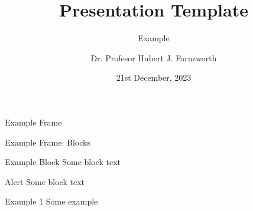 \documentclass[aspectratio=43]{beamer}
\title{Presentation Template}
\subtitle{Example}
\author[TL]{Dr. Profesor Hubert J. Farnsworth}
\institute{West University of Timișoara}
\date{21st December, 2023}
\begin{document}
\titleframe

\begin{frame}{Example Frame}
\end{frame}

\begin{frame}{Example Frame: Blocks}
\begin{block}{Example Block}
Some block text
\end{block}

\begin{alertblock}{Alert}
Some block text
\end{alertblock}

\begin{examples}{Example 1}
Some example
\end{examples}
\end{frame}
\end{document}
